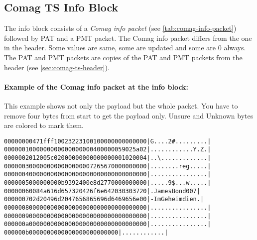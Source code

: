 \documentclass{scrartcl}
\begin{document}
\subsection{Comag TS Info Block}
\label{sec:comag-ts-info-block}

The info block consists of a \emph{Comag info packet} (see
\autoref{tab:comag-info-packet}) followed by PAT and a PMT packet. The Comag
info packet differs from the one in the header. Some values are same, some are
updated and some are 0 always. The PAT and PMT packets are copies of the PAT
and PMT packets from the header (see \autoref{sec:comag-ts-header}).

\paragraph{Example of the Comag info packet at the info block:} This example shows not only the
payload but the whole packet. You have to remove four bytes from start to get
the payload only. \textcolor{unsure}{Unsure} and \textcolor{unknown}{Unknown}
bytes are colored to mark them.

{\small
\begin{alltt}
00000000  47 1f ff 10 \textcolor{unsure}{02 32 23 10  01} 00 00 00 00 00 00 00  |G....2\#.........|
00000010  00 00 00 00 00 00 00 00  04 00 00 00 59 02 5a 02  |............Y.Z.|
00000020  12 00 5c 02 00 00 00 00  00 00 00 00 01 02 00 04  |..\textbackslash.............|
00000030  00 00 00 00 00 00 00 00  72 65 67 00 00 00 00 00  |........reg.....|
00000040  00 00 00 00 00 00 00 00  00 00 00 00 00 00 00 00  |................|
00000050  00 00 00 00 b9 39 24 00  \textcolor{unknown}{e8 d2 77 00} 00 00 00 00  |.....9\$...w.....|
00000060  08 4a 61 6d 65 73 20 42  6f 6e 64 20 30 30 37 20  |.James Bond 007 |
00000070  2d 20 49 6d 20 47 65 68  65 69 6d 64 69 65 6e 00  |- Im Geheimdien.|
00000080  00 00 00 00 00 00 00 00  00 00 00 00 00 00 00 00  |................|
00000090  00 00 00 00 00 00 00 00  00 00 00 00 00 00 00 00  |................|
000000a0  00 00 00 00 00 00 00 00  00 00 00 00 00 00 00 00  |................|
000000b0  00 00 00 00 00 00 00 00  00 00 00 00              |............|
\end{alltt}}
\end{document}
